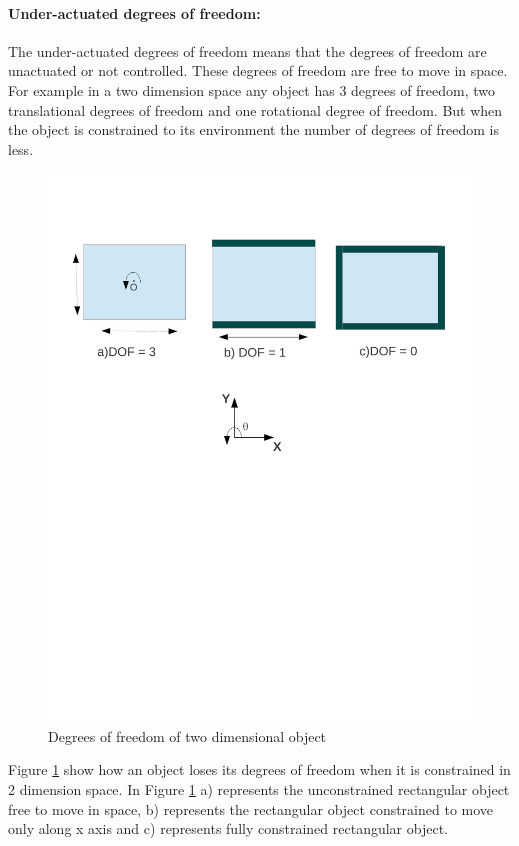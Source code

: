  \paragraph{Under-actuated degrees of freedom:}
    The under-actuated degrees of freedom means that the degrees of freedom are unactuated or not controlled. These degrees of freedom are free to move in space. For example in a two dimension space any object has 3 degrees of freedom, two translational degrees of freedom and one rotational degree of freedom. But when the object is constrained to its environment the number of degrees of freedom is less.
    \begin{figure}[H]
    \begin{center}
    \includegraphics[trim = 10mm 130mm 10mm 20mm, scale = 0.75 ]{Bilder/dof2d.pdf}
    \caption{ Degrees of freedom of two dimensional object}
    \label{fig:dof_2d}
    \end{center}
    \end{figure}
    Figure \ref{fig:dof_2d} show how an object loses its degrees of freedom when it is constrained in 2 dimension space. In Figure \ref{fig:dof_2d} a) represents the unconstrained rectangular object free to move in space, b) represents the rectangular object constrained to move only along x axis and c) represents fully constrained rectangular object. 
    
